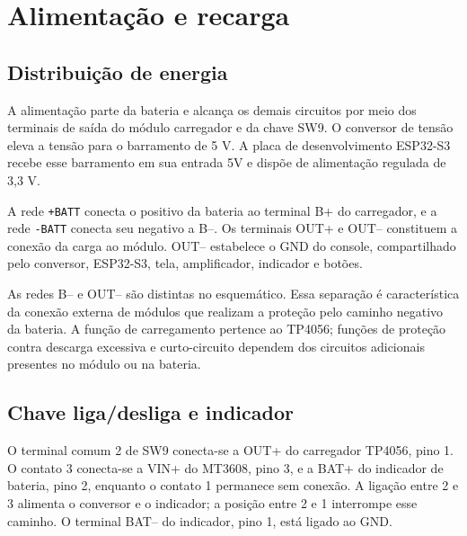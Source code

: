 \documentclass[12pt,a4paper]{article}
\begin{document}
\section{Alimentação e recarga}
\subsection{Distribuição de energia}
A alimentação parte da bateria e alcança os demais circuitos por meio dos terminais de saída do módulo carregador e da chave SW9. O conversor de tensão eleva a tensão para o barramento de 5 V. A placa de desenvolvimento ESP32-S3 recebe esse barramento em sua entrada 5V e dispõe de alimentação regulada de 3,3 V.
\begin{center}
\end{center}

A rede \texttt{+BATT} conecta o positivo da bateria ao terminal B+ do carregador, e a rede \texttt{-BATT} conecta seu negativo a B--. Os terminais OUT+ e OUT-- constituem a conexão da carga ao módulo. OUT-- estabelece o GND do console, compartilhado pelo conversor, ESP32-S3, tela, amplificador, indicador e botões.

As redes B-- e OUT-- são distintas no esquemático. Essa separação é característica da conexão externa de módulos que realizam a proteção pelo caminho negativo da bateria. A função de carregamento pertence ao TP4056; funções de proteção contra descarga excessiva e curto-circuito dependem dos circuitos adicionais presentes no módulo ou na bateria.

\subsection{Chave liga/desliga e indicador}
O terminal comum 2 de SW9 conecta-se a OUT+ do carregador TP4056, pino 1. O contato 3 conecta-se a VIN+ do MT3608, pino 3, e a BAT+ do indicador de bateria, pino 2, enquanto o contato 1 permanece sem conexão. A ligação entre 2 e 3 alimenta o conversor e o indicador; a posição entre 2 e 1 interrompe esse caminho. O terminal BAT-- do indicador, pino 1, está ligado ao GND.
\end{document}
